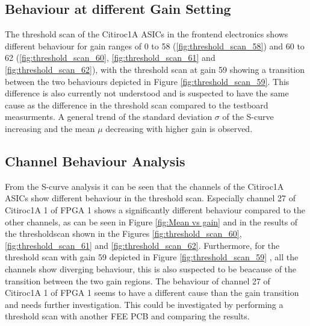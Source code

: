 \subsection{Behaviour at different Gain Setting}
The threshold scan of the Citiroc1A ASICs in the frontend electronics shows different behaviour for gain ranges of 0 to 58 (\ref{fig:threshold_scan_58}) and 60 to 62 (\ref{fig:threshold_scan_60}, \ref{fig:threshold_scan_61} and \ref{fig:threshold_scan_62}),
with the threshold scan at gain 59 showing a transition between the two behaviours depicted in Figure \ref{fig:threshold_scan_59}.
This difference is also currently not understood and is suspected to have the same cause as the difference in the threshold scan compared to the testboard measurments. 
\newline
A general trend of the standard deviation $\sigma$ of the S-curve increasing and the mean $\mu$ decreasing with higher gain is observed.
\subsection{Channel Behaviour Analysis}
From the S-curve analysis it can be seen that the channels of the Citiroc1A ASICs show different behaviour in the threshold scan.
\newline
Especially channel 27 of Citiroc1A 1 of FPGA 1 shows a significantly different behaviour compared to the other channels,
as can be seen in Figure \ref{fig:Mean vs gain} and in the results of the thresholdscan shown in the Figures \ref{fig:threshold_scan_60}, \ref{fig:threshold_scan_61} and \ref{fig:threshold_scan_62}.
\newline
Furthermore, for the threshold scan with gain 59 depicted in Figure \ref{fig:threshold_scan_59} , all the channels show diverging behaviour, this is also suspected to be beacause of the transition between the two gain regions.
\newline
The behaviour of channel 27 of Citiroc1A 1 of FPGA 1 seems to have a different cause than the gain transition and needs further investigation.
This could be investigated by performing a threshold scan with another FEE PCB and comparing the results.
